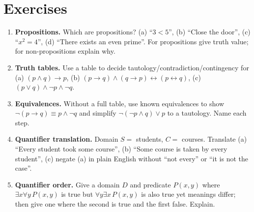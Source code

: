 \section{Exercises}
\label{sec:ch01-exercises}
\begin{enumerate}[label=E1.\arabic*, leftmargin=*, itemsep=0.6em]
\item \textbf{Propositions.} Which are propositions? (a) ``$3<5$'', (b) ``Close the door'', (c) ``$x^2=4$'', (d) ``There exists an even prime''. For propositions give truth value; for non-propositions explain why.
\item \textbf{Truth tables.} Use a table to decide tautology/contradiction/contingency for (a) $(p\land q)\to p$, (b) $(p\to q)\land(q\to p)\leftrightarrow(p\leftrightarrow q)$, (c) $(p\lor q)\land\neg p\land\neg q$.
\item \textbf{Equivalences.} Without a full table, use known equivalences to show $\neg(p\to q)\equiv p\land\neg q$ and simplify $\neg(\neg p\land q)\lor p$ to a tautology. Name each step.
\item \textbf{Quantifier translation.} Domain $S=$ students, $C=$ courses. Translate (a) ``Every student took some course'', (b) ``Some course is taken by every student'', (c) negate (a) in plain English without ``not every'' or ``it is not the case''.
\item \textbf{Quantifier order.} Give a domain $D$ and predicate $P(x,y)$ where $\exists x\forall y\,P(x,y)$ is true but $\forall y\exists x\,P(x,y)$ is also true yet meanings differ; then give one where the second is true and the first false. Explain.
\end{enumerate}

